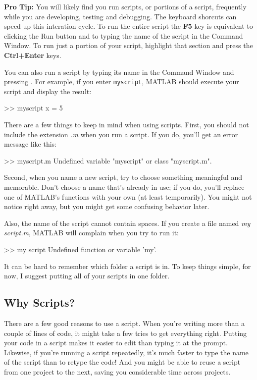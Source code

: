 
\textbf{Pro Tip:} You will likely find you run scripts, or portions of a script, frequently while you are developing, testing and debugging.  The keyboard shorcuts can speed up this interation cycle.  To run the entire script the \textbf{F5} key is equivalent to clicking the Run button and to typing the name of the script in the Command Window.  To run just a portion of your script, highlight that section and press the \textbf{Ctrl+Enter} keys.

You can also run a script by typing its name in the Command Window and pressing . For example, if you enter \lstinline{myscript}, MATLAB should execute your script and display the result:

\begin{code}
>> myscript
x = 5
\end{code}

There are a few things to keep in mind when using scripts. First, you should not include the extension \emph{.m} when you run a script.  If you do, you'll get an error message like this:

\begin{code}
>> myscript.m
Undefined variable "myscript" or class "myscript.m".
\end{code}

Second, when you name a new script, try to choose something meaningful and memorable.
Don't choose a name that's already in use; if you do, you'll replace one of MATLAB's functions with your own (at least temporarily).
You might not notice right away, but you might get some confusing behavior later.


Also, the name of the script cannot contain spaces.  If you create
a file named \emph{my script.m}, MATLAB will complain when you try
to run it:

\begin{code}
>> my script
Undefined function or variable 'my'.
\end{code}

It can be hard to remember which folder a script is in.  To keep things simple,
for now, I suggest putting all of your scripts in one folder.

\subsection{Why Scripts?}

There are a few good reasons to use a script. When you're writing more than a couple of lines of code, it might take a few tries to get everything right.  Putting your code
in a script makes it easier to edit than typing it at the prompt. Likewise, if you're running a script repeatedly, it's much faster to type the name of the script than to retype the code! And you might be able to reuse a script from one project to the next, saving you considerable time across projects.

